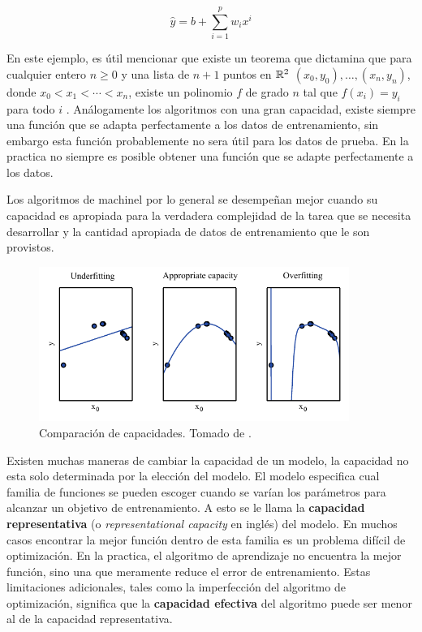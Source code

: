 \begin{equation} \label{eq:poly-function}
  \hat{y} = b + \sum_{i=1}^{p} w_i x^i
\end{equation}

En este ejemplo, es útil mencionar que existe un teorema que dictamina que para cualquier entero $n \ge 0$ y una lista de $n+1$ puntos en $\mathbb{R}^2$ $(x_0, y_0), \ldots, (x_n, y_n)$, donde $x_0 < x_1 < \cdots < x_n$, existe un polinomio $f$ de grado $n$ tal que $f(x_i) = y_i$ para todo $i$ \cite[pág 15]{kun_2018}. Análogamente los algoritmos con una gran capacidad, existe siempre una función que se adapta perfectamente a los datos de entrenamiento, sin embargo esta función probablemente no sera útil para los datos de prueba. En la practica no siempre es posible obtener una función que se adapte perfectamente a los datos.

Los algoritmos de \gls{machinel} por lo general se desempeñan mejor cuando su capacidad es apropiada para la verdadera complejidad de la tarea que se necesita desarrollar y la cantidad apropiada de datos de entrenamiento que le son provistos.

\begin{figure}[H]
  \centering
  \includegraphics[width=0.9\textwidth]{Figures/capacity-comparison.pdf}
  \decoRule
  \caption[Comparación de capacidades]{Comparación de capacidades. Tomado de \cite{deeplearning}.}
  \label{fig:capacity-comparison}
\end{figure}

Existen muchas maneras de cambiar la capacidad de un modelo, la capacidad no esta solo determinada por la elección del modelo. El modelo especifica cual familia de funciones se pueden escoger cuando se varían los parámetros para alcanzar un objetivo de entrenamiento. A esto se le llama la \textbf{capacidad representativa} (o \textsl{representational capacity} en inglés) del modelo. En muchos casos encontrar la mejor función dentro de esta familia es un problema difícil de optimización. En la practica, el algoritmo de aprendizaje no encuentra la mejor función, sino una que meramente reduce el error de entrenamiento. Estas limitaciones adicionales, tales como la imperfección del algoritmo de optimización, significa que la \textbf{capacidad efectiva} del algoritmo puede ser menor al de la capacidad representativa.

